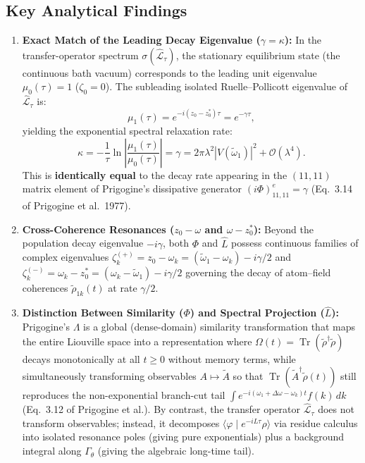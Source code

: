 \documentclass[11pt,a4paper]{article}
\begin{document}
\subsection{Key Analytical Findings}
\begin{enumerate}
    \item \textbf{Exact Match of the Leading Decay Eigenvalue ($\gamma = \kappa$):}
    In the transfer-operator spectrum $\sigma(\widehat{\mathcal{L}}_\tau)$, the stationary equilibrium state (the continuous bath vacuum) corresponds to the leading unit eigenvalue $\mu_0(\tau) = 1$ ($\zeta_0 = 0$). The subleading isolated Ruelle--Pollicott eigenvalue of $\widehat{\mathcal{L}}_\tau$ is:
    \begin{equation}
    \mu_1(\tau) = e^{-i(z_0 - z_0^*)\tau} = e^{-\gamma \tau},
    \end{equation}
    yielding the exponential spectral relaxation rate:
    \begin{equation}
    \kappa = -\frac{1}{\tau}\ln\left|\frac{\mu_1(\tau)}{\mu_0(\tau)}\right| = \gamma = 2\pi\lambda^2 |V(\tilde{\omega}_1)|^2 + \mathcal{O}(\lambda^4).
    \end{equation}
    This is \textbf{identically equal} to the decay rate appearing in the $(11, 11)$ matrix element of Prigogine's dissipative generator $(i\Phi)^e_{11,11} = \gamma$ (Eq.~3.14 of Prigogine et al.\ 1977).

    \item \textbf{Cross-Coherence Resonances ($z_0 - \omega$ and $\omega - z_0^*$):}
    Beyond the population decay eigenvalue $-i\gamma$, both $\Phi$ and $\widehat{L}$ possess continuous families of complex eigenvalues $\zeta_k^{(+)} = z_0 - \omega_k = (\tilde{\omega}_1 - \omega_k) - i\gamma/2$ and $\zeta_k^{(-)} = \omega_k - z_0^* = (\omega_k - \tilde{\omega}_1) - i\gamma/2$ governing the decay of atom--field coherences $\tilde{\rho}_{1k}(t)$ at rate $\gamma/2$.

    \item \textbf{Distinction Between Similarity ($\Phi$) and Spectral Projection ($\widehat{L}$):}
    Prigogine's $\Lambda$ is a global (dense-domain) similarity transformation that maps the entire Liouville space into a representation where $\Omega(t) = \operatorname{Tr}(\tilde{\rho}^\dagger \tilde{\rho})$ decays monotonically at all $t \ge 0$ without memory terms, while simultaneously transforming observables $A \mapsto \tilde{A}$ so that $\operatorname{Tr}(\tilde{A}^\dagger \tilde{\rho}(t))$ still reproduces the non-exponential branch-cut tail $\int e^{-i(\omega_1 + \Delta\omega - \omega_k)t} f(k)\,dk$ (Eq.~3.12 of Prigogine et al.). By contrast, the transfer operator $\widehat{\mathcal{L}}_\tau$ does not transform observables; instead, it decomposes $\langle \varphi \mid e^{-iL\tau} \rho \rangle$ via residue calculus into isolated resonance poles (giving pure exponentials) plus a background integral along $\Gamma_\theta$ (giving the algebraic long-time tail).
\end{enumerate}
\end{document}
